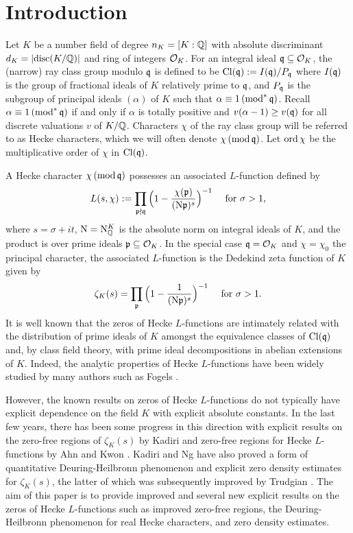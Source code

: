 \documentclass[12pt,psamsfonts]{amsart}
\theoremstyle{definition}
\theoremstyle{remark}
\numberwithin{equation}{section}
\begin{document}
\section{Introduction}
Let $K$ be a number field of degree $n_K = [K:\mathbb{Q}]$ with absolute discriminant $d_K = |\mathrm{disc}(K/\mathbb{Q})|$ and ring of integers $\mathcal{O}_K$. For an integral ideal $\mathfrak{q} \subseteq \mathcal{O}_K$, the (narrow) ray class group modulo $\mathfrak{q}$ is defined to be $\mathrm{Cl}(\mathfrak{q}) := I(\mathfrak{q})/P_{\mathfrak{q}}$
where $I(\mathfrak{q})$ is the group of fractional ideals of $K$ relatively prime to $\mathfrak{q}$, and $P_{\mathfrak{q}}$ is the subgroup of principal ideals $(\alpha)$ of $K$ such that $\alpha \equiv 1 \, (\mathrm{mod}^*{\, \mathfrak{q}} )$. Recall $\alpha \equiv 1 \, (\mathrm{mod}^*{\, \mathfrak{q}} )$ if and only if $\alpha$ is totally positive and $v(\alpha-1) \geq  v(\mathfrak{q})$ for all discrete valuations $v$ of $K/\mathbb{Q}$. Characters $\chi$ of the ray class group will be referred to as Hecke characters, which we will often denote $\chi \, (\mathrm{mod} {\, \mathfrak{q}})$. Let $\mathrm{ord}\, \chi$ be the multiplicative order of $\chi$ in $\mathrm{Cl}(\mathfrak{q})$. 

A Hecke character $\chi \, (\mathrm{mod} {\, \mathfrak{q}})$ possesses an associated $L$-function defined by
\[
L(s,\chi) := \prod_{\substack{ \mathfrak{p} \nmid \mathfrak{q}} } \Big(1 - \frac{\chi(\mathfrak{p})}{(\mathrm{N}\mathfrak{p})^{s}} \Big)^{-1} \quad \text{ for $\sigma > 1$,}
\]
where $s = \sigma+it$, $\mathrm{N} = \mathrm{N}^K_{\mathbb{Q}}$ is the absolute norm on integral ideals of $K$, and the product is over prime ideals $\mathfrak{p} \subseteq \mathcal{O}_K$. In the special case $\mathfrak{q} = \mathcal{O}_K$ and $\chi = \chi_0$ the principal character, the associated $L$-function is the Dedekind zeta function of $K$ given by
\[
\zeta_K(s) = \prod_{\mathfrak{p}} \Big(1 - \frac{1}{(\mathrm{N}\mathfrak{p})^{s}} \Big)^{-1} \quad \text{ for $\sigma > 1$}.
\]
It is well known that the zeros of Hecke $L$-functions are intimately related with the distribution of prime ideals of $K$ amongst the equivalence classes of $\mathrm{Cl}(\mathfrak{q})$ and, by class field theory, with prime ideal decompositions in abelian extensions of $K$. Indeed, the analytic properties of Hecke $L$-functions have been widely studied by many authors such as Fogels \cite{Fogels}. 

However, the known results on zeros of Hecke $L$-functions do not typically have explicit dependence on the field $K$ with explicit absolute constants.  In the last few years, there has been some progress in this direction with explicit results on the zero-free regions of $\zeta_K(s)$ by Kadiri \cite{Kadiri} and zero-free regions for Hecke $L$-functions by Ahn and Kwon \cite{Ahn-Kwon}. Kadiri and Ng \cite{KadNg} have also proved a form of quantitative Deuring-Heilbronn phenomenon  and explicit zero density estimates for $\zeta_K(s)$, the latter of which was subsequently improved by Trudgian \cite{Trudgian_2015}. The aim of this paper is to provide improved and several new explicit results on the zeros of Hecke $L$-functions such as improved zero-free regions, the Deuring-Heilbronn phenomenon for real Hecke characters, and zero density estimates. 
\end{document}
